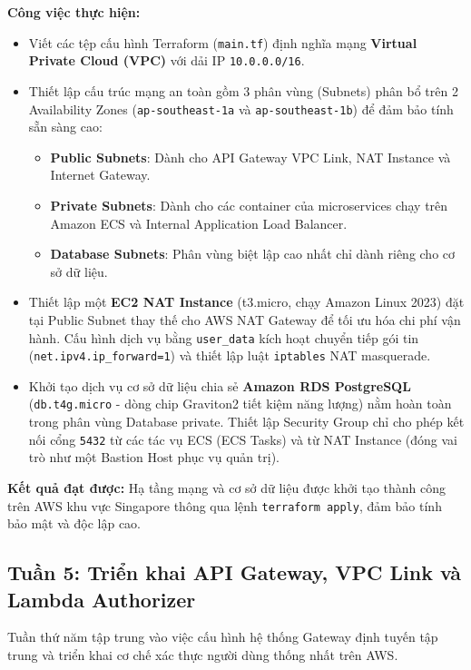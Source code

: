 \textbf{Công việc thực hiện:}
\begin{itemize}
    \item Viết các tệp cấu hình Terraform (\texttt{main.tf}) định nghĩa mạng \textbf{Virtual Private Cloud (VPC)} với dải IP \texttt{10.0.0.0/16}.
    \item Thiết lập cấu trúc mạng an toàn gồm 3 phân vùng (Subnets) phân bổ trên 2 Availability Zones (\texttt{ap-southeast-1a} và \texttt{ap-southeast-1b}) để đảm bảo tính sẵn sàng cao:
    \begin{itemize}
        \item \textbf{Public Subnets}: Dành cho API Gateway VPC Link, NAT Instance và Internet Gateway.
        \item \textbf{Private Subnets}: Dành cho các container của microservices chạy trên Amazon ECS và Internal Application Load Balancer.
        \item \textbf{Database Subnets}: Phân vùng biệt lập cao nhất chỉ dành riêng cho cơ sở dữ liệu.
    \end{itemize}
    \item Thiết lập một \textbf{EC2 NAT Instance} (t3.micro, chạy Amazon Linux 2023) đặt tại Public Subnet thay thế cho AWS NAT Gateway để tối ưu hóa chi phí vận hành. Cấu hình dịch vụ bằng \texttt{user_data} kích hoạt chuyển tiếp gói tin (\texttt{net.ipv4.ip_forward=1}) và thiết lập luật \texttt{iptables} NAT masquerade.
    \item Khởi tạo dịch vụ cơ sở dữ liệu chia sẻ \textbf{Amazon RDS PostgreSQL} (\texttt{db.t4g.micro} - dòng chip Graviton2 tiết kiệm năng lượng) nằm hoàn toàn trong phân vùng Database private. Thiết lập Security Group chỉ cho phép kết nối cổng \texttt{5432} từ các tác vụ ECS (ECS Tasks) và từ NAT Instance (đóng vai trò như một Bastion Host phục vụ quản trị).
\end{itemize}

\textbf{Kết quả đạt được:} Hạ tầng mạng và cơ sở dữ liệu được khởi tạo thành công trên AWS khu vực Singapore thông qua lệnh \texttt{terraform apply}, đảm bảo tính bảo mật và độc lập cao.

\subsection{Tuần 5: Triển khai API Gateway, VPC Link và Lambda Authorizer}

Tuần thứ năm tập trung vào việc cấu hình hệ thống Gateway định tuyến tập trung và triển khai cơ chế xác thực người dùng thống nhất trên AWS.

